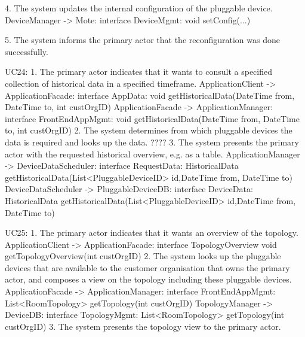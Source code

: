             4. The system updates the internal configuration of the pluggable device.
                    DeviceManager -> Mote: interface DeviceMgmt: void setConfig(...)

            5. The system informs the primary actor that the reconfiguration was done successfully.


        UC24:
            1. The primary actor indicates that it wants to consult a specified collection of historical data in
                a specified timeframe.
                ApplicationClient -> ApplicationFacade: interface AppData:
                                                void getHistoricalData(DateTime from, DateTime to, int custOrgID)
                ApplicationFacade -> ApplicationManager: interface FrontEndAppMgmt:
                                                void getHistoricalData(DateTime from, DateTime to, int custOrgID)
            2. The system determines from which pluggable devices the data is required and looks up the data.
                 ????
            3. The system presents the primary actor with the requested historical overview, e.g. as a table.
                ApplicationManager -> DeviceDataScheduler: interface RequestData:
                                      HistoricalData getHistoricalData(List<PluggableDeviceID> id,DateTime from, DateTime to)
                DeviceDataScheduler -> PluggableDeviceDB: interface DeviceData:
                                      HistoricalData getHistoricalData(List<PluggableDeviceID> id,DateTime from, DateTime to)

        UC25:
            1. The primary actor indicates that it wants an overview of the topology.
                ApplicationClient -> ApplicationFacade: interface TopologyOverview
                                                               void getTopologyOverview(int custOrgID)
            2. The system looks up the pluggable devices that are available to the customer organisation
           that owns the primary actor, and composes a view on the topology including these pluggable devices.
                ApplicationFacade -> ApplicationManager: interface FrontEndAppMgmt: List<RoomTopology> getTopology(int custOrgID)
                TopologyManager -> DeviceDB: interface TopologyMgmt: List<RoomTopology> getTopology(int custOrgID)
            3. The system presents the topology view to the primary actor.

